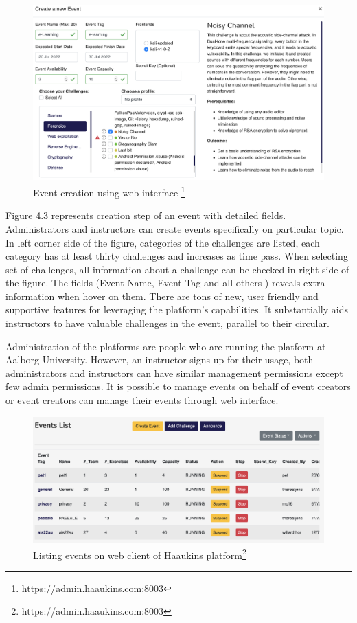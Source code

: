 \begin{figure}[htbp]
\centerline{\includegraphics[scale=.4]{figures/web-interface.png}}
\caption[Event creation using web interface]{Event creation using web interface \footnote{https://admin.haaukins.com:8003}}
\label{fig}
\end{figure}

Figure 4.3 represents creation step of an event with detailed fields. Administrators and instructors can create events specifically on particular topic. In left corner side of the figure, categories of the challenges are listed, each category has at least thirty challenges and increases as time pass. When selecting set of challenges, all information about a challenge can be checked in right side of the figure. The fields (Event Name, Event Tag and all others ) reveals extra information when hover on them. 
There are tons of new, user friendly and supportive features for leveraging the platform's capabilities. It substantially aids  instructors to have valuable challenges in the event, parallel to their circular.

Administration of the platforms are people who are running the platform at Aalborg University. However, an instructor signs up for their usage, both administrators and instructors can have similar management permissions except few admin permissions.
It is possible to manage events on behalf of event creators or event creators can manage their events through web interface. 

\begin{figure}[htbp]
\centerline{\includegraphics[scale=.4]{figures/events_list.png}}
\caption[Listing events on web client of Haaukins platform ]{Listing events on web client of Haaukins platform\footnote{https://admin.haaukins.com:8003}}
\label{fig}
\end{figure} 

